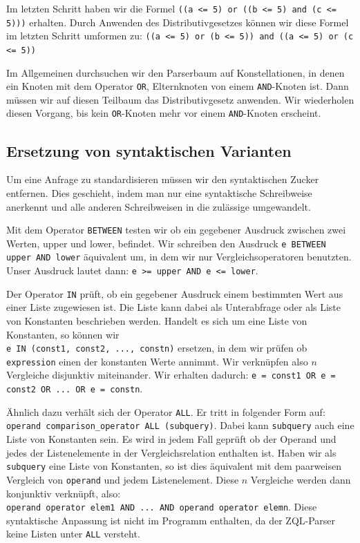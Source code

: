 Im letzten Schritt haben wir die Formel \verb|((a <= 5) or ((b <= 5) and (c <= 5)))| erhalten. Durch Anwenden des Distributivgesetzes können wir diese Formel im letzten Schritt umformen zu: \verb|((a <= 5) or (b <= 5)) and ((a <= 5) or (c <= 5))|

Im Allgemeinen durchsuchen wir den Parserbaum auf Konstellationen, in denen ein Knoten mit dem Operator \verb|OR|, Elternknoten von einem \verb|AND|-Knoten ist. Dann müssen wir auf diesen Teilbaum das Distributivgesetz anwenden. Wir wiederholen diesen Vorgang, bis kein \verb|OR|-Knoten mehr vor einem \verb|AND|-Knoten erscheint.

\subsection{Ersetzung von syntaktischen Varianten}

Um eine Anfrage zu standardisieren müssen wir den syntaktischen Zucker entfernen. Dies geschieht, indem man nur eine syntaktische Schreibweise anerkennt und alle anderen Schreibweisen in die zulässige umgewandelt. 

Mit dem Operator \verb|BETWEEN| testen wir ob ein gegebener Ausdruck zwischen zwei Werten, upper und lower, befindet. Wir schreiben den Ausdruck \verb|e BETWEEN upper AND lower| äquivalent um, in dem wir nur Vergleichsoperatoren benutzten. \\Unser Ausdruck lautet dann: \verb|e >= upper AND e <= lower|.

Der Operator \verb|IN| prüft, ob ein gegebener Ausdruck einem bestimmten Wert aus einer Liste zugewiesen ist. Die Liste kann dabei als Unterabfrage oder als Liste von Konstanten beschrieben werden. Handelt es sich um eine Liste von Konstanten, so können wir \\\verb|e IN (const1, const2, ..., constn)| ersetzen, in dem wir prüfen ob \verb|expression| einen der konstanten Werte annimmt. Wir verknüpfen also $n$ Vergleiche disjunktiv miteinander. Wir erhalten dadurch: \verb|e = const1 OR e = const2 OR ... OR e = constn|.

Ähnlich dazu verhält sich der Operator \verb|ALL|. Er tritt in folgender Form auf:\\
\verb|operand comparison_operator ALL (subquery)|. Dabei kann \verb|subquery| auch eine Liste von Konstanten sein. Es wird in jedem Fall geprüft ob der Operand und jedes der Listenelemente in der Vergleichsrelation enthalten ist. Haben wir als \verb|subquery| eine Liste von Konstanten, so ist dies äquivalent mit dem paarweisen Vergleich von \verb|operand| und jedem Listenelement. Diese $n$ Vergleiche werden dann konjunktiv verknüpft, also: \\
\verb|operand operator elem1 AND ... AND operand operator elemn|. 
Diese syntaktische Anpassung ist nicht im Programm enthalten, da der ZQL-Parser keine Listen unter \verb|ALL| versteht.

